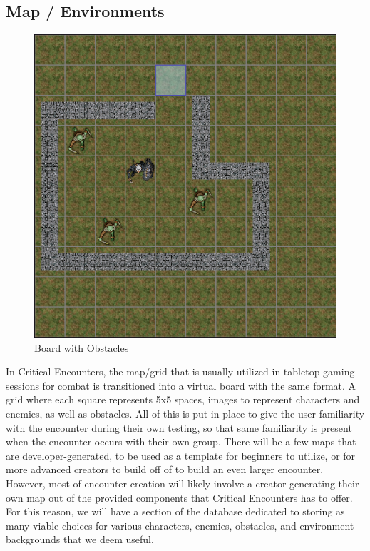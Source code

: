 \documentclass[12pt,a4paper]{report}
\begin{document}
	\newpage
	\subsection{Map / Environments}
		\begin{figure}[H]
		\centering
		\includegraphics[scale=.6]{environment}
		\caption{Board with Obstacles}
		\label{fig: Board with Obstacles}
	\end{figure}
	In Critical Encounters, the map/grid that is usually utilized in tabletop gaming sessions for combat is transitioned into a virtual board with the same format. A grid where each square represents 5x5 spaces, images to represent characters and enemies, as well as obstacles. All of this is put in place to give the user familiarity with the encounter during their own testing, so that same familiarity is present when the encounter occurs with their own group. There will be a few maps that are developer-generated, to be used as a template for beginners to utilize, or for more advanced creators to build off of to build an even larger encounter. However, most of encounter creation will likely involve a creator generating their own map out of the provided components that Critical Encounters has to offer. For this reason, we will have a section of the database dedicated to storing as many viable choices for various characters, enemies, obstacles, and environment backgrounds that we deem useful.
	
\end{document}
